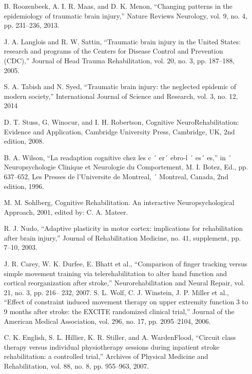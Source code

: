


\begin{thebibliography}{31}
B. Roozenbeek, A. I. R. Maas, and D. K. Menon, “Changing
patterns in the epidemiology of traumatic brain injury,” Nature
Reviews Neurology, vol. 9, no. 4, pp. 231–236, 2013.

 J. A. Langlois and R. W. Sattin, “Traumatic brain injury in the
United States: research and programs of the Centers for Disease
Control and Prevention (CDC),” Journal of Head Trauma
Rehabilitation, vol. 20, no. 3, pp. 187–188, 2005.

S. A. Tabish and N. Syed, “Traumatic brain injury: the neglected
epidemic of modern society,” International Journal of Science
and Research, vol. 3, no. 12, 2014

D. T. Stuss, G. Winocur, and I. H. Robertson, Cognitive NeuroRehabilitation: Evidence and Application, Cambridge University
Press, Cambridge, UK, 2nd edition, 2008.

B. A. Wilson, “La readaption cognitive chez les c ´ er´ ebro-l ´ es´ es,” in ´
Neuropsychologie Clinique et Neurologie du Comportement, M. I.
Botez, Ed., pp. 637–652, Les Presses de l’Universite de Montreal, ´
Montreal, Canada, 2nd edition, 1996.

M. M. Sohlberg, Cognitive Rehabilitation. An interactive Neuropsychological Approach, 2001, edited by: C. A. Mateer.

R. J. Nudo, “Adaptive plasticity in motor cortex: implications
for rehabilitation after brain injury,” Journal of Rehabilitation
Medicine, no. 41, supplement, pp. 7–10, 2003.

J. R. Carey, W. K. Durfee, E. Bhatt et al., “Comparison of finger
tracking versus simple movement training via telerehabilitation
to alter hand function and cortical reorganization after stroke,”
Neurorehabilitation and Neural Repair, vol. 21, no. 3, pp. 216–
232, 2007.
S. L. Wolf, C. J. Winstein, J. P. Miller et al., “Effect of constraint induced movement therapy on upper extremity function 3 to
9 months after stroke: the EXCITE randomized clinical trial,”
Journal of the American Medical Association, vol. 296, no. 17, pp.
2095–2104, 2006.

C. K. English, S. L. Hillier, K. R. Stiller, and A. WardenFlood, “Circuit class therapy versus individual physiotherapy
sessions during inpatient stroke rehabilitation: a controlled
trial,” Archives of Physical Medicine and Rehabilitation, vol. 88,
no. 8, pp. 955–963, 2007.


\end{thebibliography}
